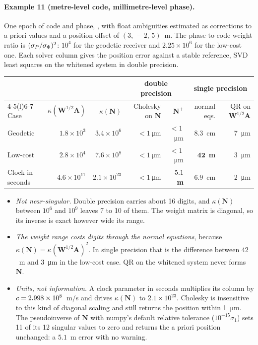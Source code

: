 \documentclass[main.tex]{subfiles}
\begin{document}
\paragraph{Example 11 (metre-level code, millimetre-level phase).}
\label{la:ex11}%
One epoch of code and phase, , with float
ambiguities estimated as corrections to a priori values and a position
offset of $(3,\,-2,\,5)$~m.  The phase-to-code weight ratio is
$(\sigma_P/\sigma_\Phi)^2$: $10^4$ for the geodetic receiver and
$2.25\times10^6$ for the low-cost one.  Each solver column gives the
position error against a stable reference, SVD least squares on the
whitened system in double precision.
\begin{center}
\footnotesize
\setlength{\tabcolsep}{4pt}
\begin{tabular}{@{}lrrrrrr@{}}
\toprule
& & & \multicolumn{2}{c}{double precision} & \multicolumn{2}{c}{single precision} \\
\cmidrule(lr){4-5}\cmidrule(l){6-7}
Case & $\kappa(\bm{W}^{1/2}\bm{A})$ & $\kappa(\bm{N})$ & Cholesky on $\bm{N}$
  & $\bm{N}^{+}$ & normal eqs. & QR on $\bm{W}^{1/2}\bm{A}$ \\
\midrule
Geodetic & $1.8\times10^{3}$ & $3.4\times10^{6}$ & $<1$\,\si{\micro\metre} & $<1$\,\si{\micro\metre} & $8.3$~cm & \SI{7}{\micro\metre} \\
Low-cost & $2.8\times10^{4}$ & $7.6\times10^{8}$ & $<1$\,\si{\micro\metre} & $<1$\,\si{\micro\metre} & $\mathbf{42}$~\textbf{m} & \SI{3}{\micro\metre} \\
Clock in seconds & $4.6\times10^{11}$ & $2.1\times10^{23}$ & $<1$\,\si{\micro\metre} & $\mathbf{5.1}$~\textbf{m} & $6.9$~cm & \SI{2}{\micro\metre} \\
\bottomrule
\end{tabular}
\end{center}
\begin{itemize}[leftmargin=*, itemsep=1pt]
\item \emph{Not near-singular.}  Double precision carries about 16 digits,
      and $\kappa(\bm{N})$ between $10^6$ and $10^9$ leaves 7 to 10 of them.
      The weight matrix is diagonal, so its inverse is exact however wide
      its range.
\item \emph{The weight range costs digits through the normal equations},
      because $\kappa(\bm{N}) = \kappa(\bm{W}^{1/2}\bm{A})^2$.  In single
      precision that is the difference between $42$~m and \SI{3}{\micro\metre} in the
      low-cost case.  QR on the whitened system never forms $\bm{N}$.
\item \emph{Units, not information.}  A clock parameter in seconds
      multiplies its column by $c = 2.998\times10^8$~m/s and drives
      $\kappa(\bm{N})$ to $2.1\times10^{23}$.  Cholesky is insensitive to
      this kind of diagonal scaling and still returns the position within
      \SI{1}{\micro\metre}.  The pseudoinverse of $\bm{N}$ with numpy's default relative
      tolerance ($10^{-15}\sigma_1$) sets 11 of its 12 singular values to
      zero and returns the a priori position unchanged: a $5.1$~m error with
      no warning.
\end{itemize}
\end{document}
